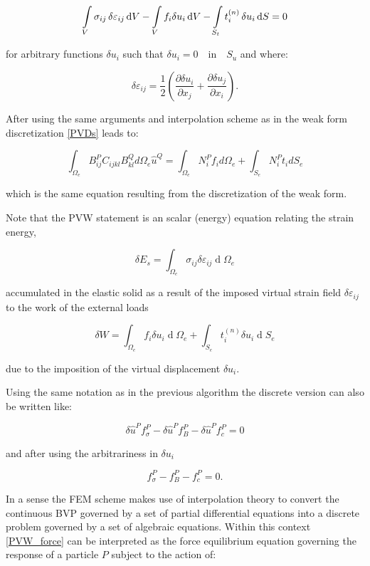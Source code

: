 \begin{equation}
\int\limits_V \sigma _{ij}\var{\varepsilon_{ij}}\dd{V}  - \int\limits_V f_i\delta u_i\dd{V}  - \int\limits_{S_t} t_i^{(n)}\var{u_i}\dd{S}  = 0
\label{PVDs}
\end{equation}

for arbitrary functions $\delta u_i$ such that  $\delta u_i =0 \quad \text{in} \quad  S_u$ and where:

\[\delta\varepsilon_{ij}=\frac12\left(\frac{\partial\delta u_i}{\partial x_j}+\frac{\partial\delta u_j}{\partial x_i}\right).\]

After using the same arguments and interpolation scheme as in the weak form discretization \cref{PVDs} leads to:


\[\int_{\Omega_e}B_{ij}^PC_{ijkl}B_{kl}^Qd\Omega_e\widehat u^Q=\int_{\Omega_e}N_i^Pf_id\Omega_e+\int_{S_e}N_i^Pt_idS_e\]

which is the same equation resulting from the discretization of the weak form.

Note that the PVW statement is an scalar (energy) equation relating the strain energy,

\[\delta E_s=\int_{\Omega_e}\sigma_{ij}\delta\varepsilon_{ij}\operatorname d\Omega_e\]

accumulated in the elastic solid as a result of the imposed virtual strain field $\delta\varepsilon_{ij}$ to the work of the external loads

\[\delta W=\int_{\Omega_e}f_i\delta u_i\operatorname d\Omega_e+\int_{S_e}t_i^{(n)}\delta u_i\operatorname dS_e\]

due to the imposition of the virtual displacement $\delta u_i$.

Using the same notation as in the previous algorithm the discrete version can also be written like:

\[\delta\widehat u^Pf_\sigma^P-\delta\widehat u^Pf_B^P-\delta\widehat u^Pf_c^P=0\]

and after using the arbitrariness in $\delta u_i$

\begin{equation}
f_\sigma^P-f_B^P-f_c^P=0.
\label{PVW_force}
\end{equation}


In a sense the FEM scheme makes use of interpolation theory to convert the continuous BVP governed by a set of partial differential equations into a discrete problem governed by a set of algebraic equations. Within this context \cref{PVW_force} can be interpreted as the force equilibrium equation governing the response of a particle $P$ subject to the action of:

